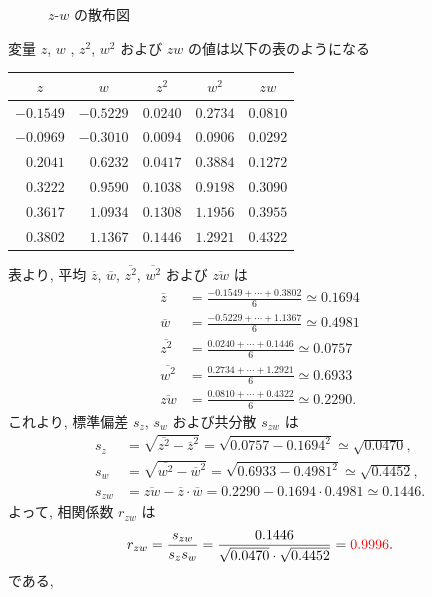 \begin{qenumerate}
{\begin{figure}[H]
\begin{minipage}{0.49\columnwidth}
				$z$-$w$ の散布図
			\end{minipage}
		\end{figure}
		変量 $z$, $w$ , $z^{2}$, $w^{2}$ および $zw$ の値は以下の表のようになる
		\begin{table}[H]
			\centering
			\begin{tabular}{r|r|r|r|r} \hline
				\multicolumn{1}{c|}{$z$} & \multicolumn{1}{c|}{$w$} & \multicolumn{1}{c|}{$z^{2}$} & \multicolumn{1}{c|}{$w^{2}$} & \multicolumn{1}{c}{$zw$} \\ \hline
				$-0.1549$ & $-0.5229$ & $0.0240$ & $0.2734$ & $0.0810$ \\
				$-0.0969$ & $-0.3010$ & $0.0094$ & $0.0906$ & $0.0292$ \\
				$ 0.2041$ & $ 0.6232$ & $0.0417$ & $0.3884$ & $0.1272$ \\
				$ 0.3222$ & $ 0.9590$ & $0.1038$ & $0.9198$ & $0.3090$ \\
				$ 0.3617$ & $ 1.0934$ & $0.1308$ & $1.1956$ & $0.3955$ \\
				$ 0.3802$ & $ 1.1367$ & $0.1446$ & $1.2921$ & $0.4322$ \\ \hline
			\end{tabular}
		\end{table}
		表より, 平均 $\overline{z}$, $\overline{w}$, $\overline{z^{2}}$, $\overline{w^{2}}$ および $\overline{zw}$ は
		\begin{align}
			\overline{z} &= \frac{-0.1549 + \cdots + 0.3802}{6} \simeq 0.1694\\
			\overline{w} &= \frac{-0.5229 + \cdots + 1.1367}{6} \simeq 0.4981\\
			\overline{z^{2}} &= \frac{0.0240 + \cdots + 0.1446}{6} \simeq 0.0757\\
			\overline{w^{2}} &= \frac{0.2734 + \cdots + 1.2921}{6} \simeq 0.6933\\
			\overline{zw} &= \frac{0.0810 + \cdots + 0.4322}{6} \simeq 0.2290.
		\end{align}
		これより, 標準偏差 $s_{z}$, $s_{w}$ および共分散 $s_{zw}$ は
		\begin{align}
			s_{z} &= \sqrt{\overline{z^{2}} - {\overline{z}}^{2}} = \sqrt{0.0757 - 0.1694^{2}} \simeq \sqrt{0.0470}, \\
			s_{w} &= \sqrt{\overline{w^{2}} - {\overline{w}}^{2}} = \sqrt{0.6933 - 0.4981^{2}} \simeq \sqrt{0.4452}, \\
			s_{zw} &= \overline{zw} - \overline{z}\cdot \overline{w} = 0.2290 - 0.1694\cdot 0.4981 \simeq 0.1446.
		\end{align}
		よって, 相関係数 $r_{zw}$ は
		\begin{align}
			r_{zw} = \frac{s_{zw}}{s_{z}s_{w}} = \frac{0.1446}{\sqrt{0.0470}\cdot \sqrt{0.4452}} = \textcolor{red}{0.9996}.
		\end{align}
		である,
	}
\end{qenumerate}

